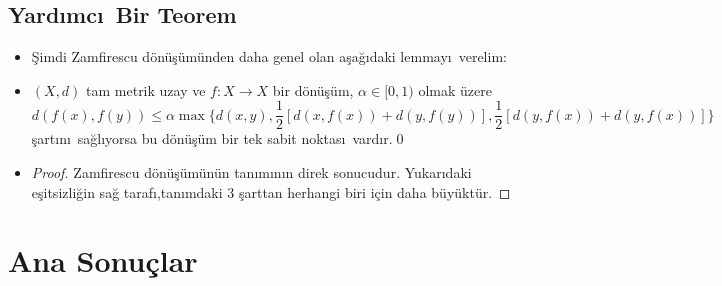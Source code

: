 \documentclass[8pt]{beamer}
\begin{document}
\subsection{Yard\i mc\i\ Bir Teorem}
\begin{frame}
\begin{itemize}[<+-| alert@+>]  

 \item[] \c{S}imdi Zamfirescu d\"{o}n\"{u}\c{s}\"{u}m\"{u}nden daha genel olan a\c{s}a\u{g}\i daki lemmay\i\ verelim:

 \item[] \begin{lemma}
  $(X,d)$ tam metrik uzay ve $f: X \rightarrow X$ bir d\"{o}n\"{u}\c{s}\"{u}m,
  $\alpha \in [0,1)$ olmak \"uzere
  \begin{equation*}
    d(f(x), f(y))\leq \alpha\max\bigg\{ d(x,y), \frac{1}{2}[d(x,f(x))+d(y,f(y))], \frac{1}{2}[d(y,f(x))+d(y,f(x))] \bigg\} 
  \end{equation*}
  \c{s}art\i n\i\ sa\u{g}l\i yorsa bu d\"{o}n\"{u}\c{s}\"{u}m bir tek sabit noktas\i\ vard\i r.\qed
\end{lemma}

  \item[] \begin{proof}Zamfirescu d\"{o}n\"{u}\c{s}\"{u}m\"{u}n\"{u}n tan\i m\i n\i n direk sonucudur. Yukar\i daki e\c{s}itsizli\u{g}in sa\u{g} taraf\i ,tan\i mdaki 3 \c{s}arttan herhangi biri i\c{c}in daha b\"uy\"ukt\"ur. 
 \end{proof}
\end{itemize}

\end{frame}%


\section{Ana Sonu\c{c}lar}
\end{document}
